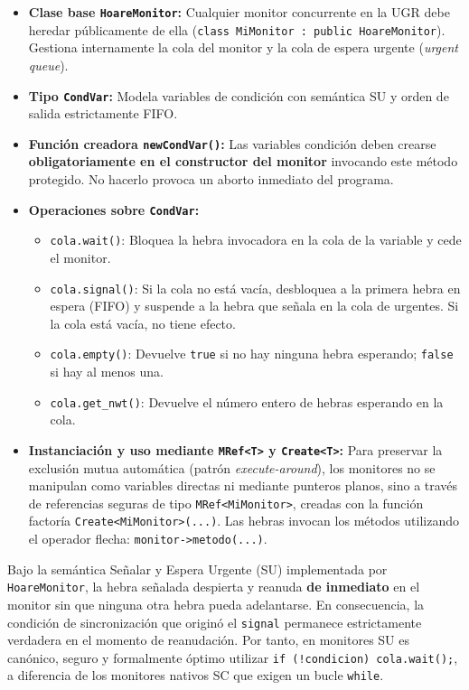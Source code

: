 \begin{definicion}
\begin{itemize}[leftmargin=*]
    \item \textbf{Clase base \texttt{HoareMonitor}:} Cualquier monitor concurrente en la UGR debe heredar públicamente de ella (\texttt{class MiMonitor : public HoareMonitor}). Gestiona internamente la cola del monitor y la cola de espera urgente (\emph{urgent queue}).
    \item \textbf{Tipo \texttt{CondVar}:} Modela variables de condición con semántica SU y orden de salida estrictamente FIFO.
    \item \textbf{Función creadora \texttt{newCondVar()}:} Las variables condición deben crearse \textbf{obligatoriamente en el constructor del monitor} invocando este método protegido. No hacerlo provoca un aborto inmediato del programa.
    \item \textbf{Operaciones sobre \texttt{CondVar}:}
    \begin{itemize}
        \item \texttt{cola.wait()}: Bloquea la hebra invocadora en la cola de la variable y cede el monitor.
        \item \texttt{cola.signal()}: Si la cola no está vacía, desbloquea a la primera hebra en espera (FIFO) y suspende a la hebra que señala en la cola de urgentes. Si la cola está vacía, no tiene efecto.
        \item \texttt{cola.empty()}: Devuelve \texttt{true} si no hay ninguna hebra esperando; \texttt{false} si hay al menos una.
        \item \texttt{cola.get\_nwt()}: Devuelve el número entero de hebras esperando en la cola.
    \end{itemize}
    \item \textbf{Instanciación y uso mediante \texttt{MRef<T>} y \texttt{Create<T>}:}
    Para preservar la exclusión mutua automática (patrón \emph{execute-around}), los monitores no se manipulan como variables directas ni mediante punteros planos, sino a través de referencias seguras de tipo \texttt{MRef<MiMonitor>}, creadas con la función factoría \texttt{Create<MiMonitor>(...)}. Las hebras invocan los métodos utilizando el operador flecha: \texttt{monitor->metodo(...)}.
\end{itemize}
\end{definicion}

\begin{aviso}
Bajo la semántica Señalar y Espera Urgente (SU) implementada por \texttt{HoareMonitor}, la hebra señalada despierta y reanuda \textbf{de inmediato} en el monitor sin que ninguna otra hebra pueda adelantarse. En consecuencia, la condición de sincronización que originó el \texttt{signal} permanece estrictamente verdadera en el momento de reanudación. Por tanto, en monitores SU es canónico, seguro y formalmente óptimo utilizar \texttt{if (!condicion) cola.wait();}, a diferencia de los monitores nativos SC que exigen un bucle \texttt{while}.
\end{aviso}

